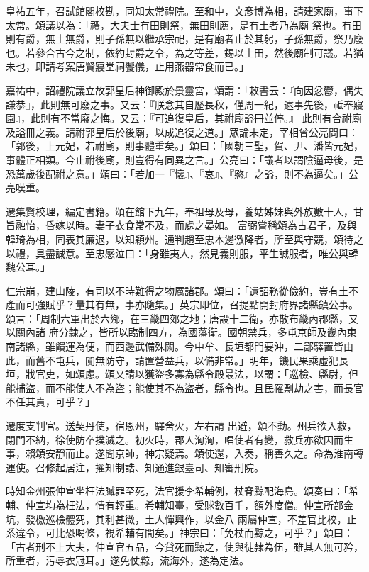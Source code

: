 \begin{pinyinscope}
 皇祐五年，召試館閣校勘，同知太常禮院。至和中，文彥博為相，請建家廟，事下太常。頌議以為：「禮，大夫士有田則祭，無田則薦，是有土者乃為廟
 祭也。有田則有爵，無土無爵，則子孫無以繼承宗祀，是有廟者止於其躬，子孫無爵，祭乃廢也。若參合古今之制，依約封爵之令，為之等差，錫以土田，然後廟制可議。若猶未也，即請考案唐賢寢堂祠饗儀，止用燕器常食而已。」



 嘉祐中，詔禮院議立故郭皇后神御殿於景靈宮，頌謂：「敕書云：『向因忿鬱，偶失謙恭』，此則無可廢之事。又云：『朕念其自歷長秋，僅周一紀，逮事先後，祗奉寢園』，此則有不當廢之悔。又云：『可追復皇后，其祔廟謚冊並停。』
 此則有合祔廟及謚冊之義。請祔郭皇后於後廟，以成追復之道。」眾論未定，宰相曾公亮問曰：「郭後，上元妃，若祔廟，則事體重矣。」頌曰：「國朝三聖，賀、尹、潘皆元妃，事體正相類。今止祔後廟，則豈得有同異之言。」公亮曰：「議者以謂陰逼母後，是恐萬歲後配祔之意。」頌曰：「若加一『懷』、『哀』、『愍』之謚，則不為逼矣。」公亮嘆重。



 遷集賢校理，編定書籍。頌在館下九年，奉祖母及母，養姑姊妹與外族數十人，甘旨融怡，昏嫁以時。妻子衣食常不及，而處之晏如。
 富弼嘗稱頌為古君子，及與韓琦為相，同表其廉退，以知穎州。通判趙至忠本邊徼降者，所至與守競，頌待之以禮，具盡誠意。至忠感泣曰：「身雖夷人，然見義則服，平生誠服者，唯公與韓魏公耳。」



 仁宗崩，建山陵，有司以不時難得之物厲諸郡。頌曰：「遺詔務從儉約，豈有土不產而可強賦乎？量其有無，事亦隨集。」英宗即位，召提點開封府界諸縣鎮公事。頌言：「周制六軍出於六鄉，在三畿四郊之地；唐設十二衛，亦散布畿內郡縣，又以關內諸
 府分隸之，皆所以臨制四方，為國藩衛。國朝禁兵，多屯京師及畿內東南諸縣，雖饋運為便，而西邊武備殊闕。今中牟、長垣都門要沖，二鄙驛置皆由此，而舊不屯兵，闃無防守，請置營益兵，以備非常。」明年，饑民果乘虛犯長垣，戕官吏，如頌慮。頌又請以獲盜多寡為縣令殿最法，以謂：「巡檢、縣尉，但能捕盜，而不能使人不為盜；能使其不為盜者，縣令也。且民罹剽劫之害，而長官不任其責，可乎？」



 遷度支判官。送契丹使，宿恩州，驛舍火，左右請
 出避，頌不動。州兵欲入救，閉門不納，徐使防卒撲滅之。初火時，郡人洶洶，唱使者有變，救兵亦欲因而生事，賴頌安靜而止。遂聞京師，神宗疑焉。頌使還，入奏，稱善久之。命為淮南轉運使。召修起居注，擢知制誥、知通進銀臺司、知審刑院。



 時知金州張仲宣坐枉法贓罪至死，法官援李希輔例，杖脊黥配海島。頌奏曰：「希輔、仲宣均為枉法，情有輕重。希輔知臺，受賕數百千，額外度僧。仲宣所部金坑，發檄巡檢體究，其利甚微，土人憚興作，以金八
 兩屬仲宣，不差官比校，止系違令，可比恐喝條，視希輔有間矣。」神宗曰：「免杖而黥之，可乎？」頌曰：「古者刑不上大夫，仲宣官五品，今貸死而黥之，使與徒隸為伍，雖其人無可矜，所重者，污辱衣冠耳。」遂免仗黥，流海外，遂為定法。




\end{pinyinscope}
